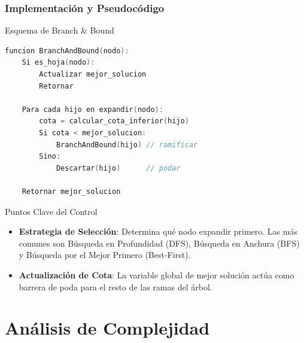 \documentclass[aspectratio=169]{beamer}
\begin{document}
\begin{frame}[fragile]
    \frametitle{Implementación y Pseudocódigo}
    \justifying
    
    \begin{minipage}[t]{0.52\textwidth}
        \begin{block}{Esquema de Branch \& Bound}
            \scriptsize
            \begin{lstlisting}[language=C]
funcion BranchAndBound(nodo):
    Si es_hoja(nodo):
        Actualizar mejor_solucion
        Retornar
    
    Para cada hijo en expandir(nodo):
        cota = calcular_cota_inferior(hijo)
        Si cota < mejor_solucion:
            BranchAndBound(hijo) // ramificar
        Sino:
            Descartar(hijo)      // podar
            
    Retornar mejor_solucion
            \end{lstlisting}
        \end{block}
    \end{minipage}
    \hfill
    \begin{minipage}[t]{0.44\textwidth}
        \begin{block}{Puntos Clave del Control}
            \small
            \begin{itemize}
                \item \textbf{Estrategia de Selección}: Determina qué nodo expandir primero. Las más comunes son Búsqueda en Profundidad (DFS), Búsqueda en Anchura (BFS) y Búsqueda por el Mejor Primero (Best-First).
                \item \textbf{Actualización de Cota}: La variable global de mejor solución actúa como barrera de poda para el resto de las ramas del árbol.
            \end{itemize}
        \end{block}
    \end{minipage}
\end{frame}

\section{Análisis de Complejidad}
\end{document}
